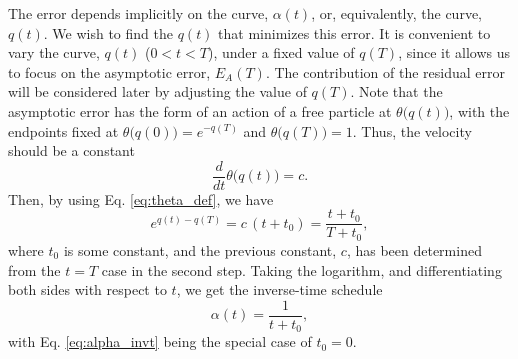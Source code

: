 \documentclass[reprint, superscriptaddress, floatfix]{revtex4-1}
\newcommand{\Err}{E}
\begin{document}
The error depends implicitly on the curve, $\alpha(t)$,
or, equivalently, the curve, $q(t)$.
%
%
We wish to find the $q(t)$
that minimizes this error.
%
It is convenient to
vary the curve, $q(t)$ ($0 < t < T$),
under a fixed value of $q(T)$,
since it allows us to focus on
the asymptotic error, $E_A(T)$.
%
The contribution of the residual error
will be considered later
by adjusting the value of $q(T)$.
%
Note that the asymptotic error
has the form of an action of a free particle
at $\theta\bigl( q(t) \bigr)$,
with the endpoints fixed at
$\theta\bigl( q(0) \bigr)  = e^{- q(T)}$
and
$\theta\bigl( q(T) \bigr) = 1$.
%
Thus, the velocity should be a constant
%
\begin{equation}
  \frac{d}{dt} \theta\bigl( q(t) \bigr) = c
  .
\label{eq:dthetadt_const}
\end{equation}
%
Then, by using Eq. \eqref{eq:theta_def}, we have
%
\begin{equation}
  e^{ q(t) - q(T) }
  =
  c \, (t + t_0)
  =
  \frac{ t + t_0 }
       { T + t_0 }
  ,
\label{eq:expqt}
\end{equation}
%
where $t_0$ is some constant,
and the previous constant, $c$, has been determined
from the $t = T$ case
in the second step.
%
Taking the logarithm,
and differentiating both sides
with respect to $t$,
we get the inverse-time schedule
%
\begin{equation}
  \alpha(t) = \frac{ 1 }{ t + t_0 }
  ,
\label{eq:alpha_invt1}
\end{equation}
%
with Eq. \eqref{eq:alpha_invt} being
the special case of $t_0 = 0$.
%
\end{document}

